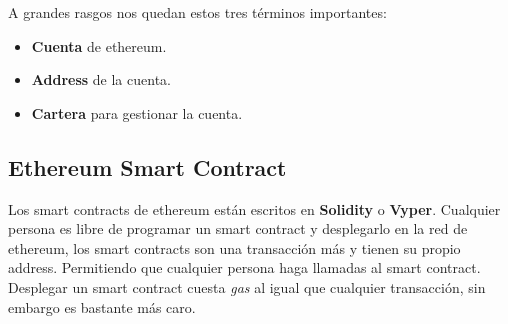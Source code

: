 A grandes rasgos nos quedan estos tres términos importantes:
\begin{itemize}
\item \textbf{Cuenta} de ethereum.
\item \textbf{Address} de la cuenta.
\item \textbf{Cartera} para gestionar la cuenta.
\end{itemize}

\subsection{Ethereum Smart Contract}

Los smart contracts de ethereum están escritos en \textbf{Solidity}\cite{SolidityDocs} o \textbf{Vyper}\cite{VyperDocs}. Cualquier persona es libre de programar un smart contract y desplegarlo en la red de ethereum, los smart contracts son una transacción más y tienen su propio address. Permitiendo que cualquier persona haga llamadas al smart contract. Desplegar un smart contract cuesta \emph{gas} al igual que cualquier transacción, sin embargo es bastante más caro. 

